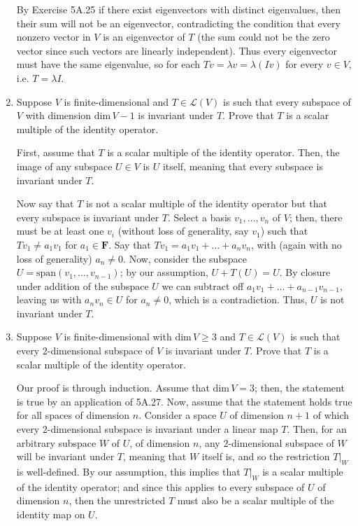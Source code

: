 \documentclass{book}
\begin{document}
\begin{enumerate}
By Exercise 5A.25 if there exist eigenvectors with distinct eigenvalues, then their sum will not be an eigenvector, contradicting the condition that every nonzero vector in \(V\) is an eigenvector of \(T\) (the sum could not be the zero vector since such vectors are linearly independent).  Thus every eigenvector must have the same eigenvalue, so for each \(Tv=\lambda{v}=\lambda(Iv)\) for every \(v \in V\), i.e. \(T=\lambda{I}\).

\item Suppose \(V\) is finite-dimensional and \(T \in \mathcal{L}(V)\) is such that every subspace of \(V\) with dimension \(\textrm{dim} \, V - 1\) is invariant under \(T\).  Prove that \(T\) is a scalar multiple of the identity operator.

First, assume that \(T\) is a scalar multiple of the identity operator.  Then, the image of any subspace \(U \in V\) is \(U\) itself, meaning that every subspace is invariant under \(T\).

Now say that \(T\) is not a scalar multiple of the identity operator but that every subspace is invariant under \(T\).  Select a basis \(v_1,\dots,v_n\) of \(V\); then, there must be at least one \(v_i\) (without loss of generality, say \(v_1\)) such that \(Tv_1 \neq a_1v_1\) for \(a_1 \in \textbf{F}\).  Say that \(Tv_1 = a_1v_1 + \dots + a_nv_n\), with (again with no loss of generality) \(a_n \neq 0\).  Now, consider the subspace \(U = \text{span}(v_1,\dots,v_{n-1})\); by our assumption, \(U + T(U) = U\).  By closure under addition of the subspace \(U\) we can subtract off \(a_1v_1 + \dots + a_{n-1}v_{n-1}\), leaving us with \(a_nv_n \in U\) for \(a_n \neq 0\), which is a contradiction.  Thus, \(U\) is not invariant under \(T\).

\item Suppose \(V\) is finite-dimensional with \(\textrm{dim} \, V \geq 3\) and \(T \in \mathcal{L}(V)\) is such that every \(2\)-dimensional subspace of \(V\) is invariant under \(T\).  Prove that \(T\) is a scalar multiple of the identity operator.

Our proof is through induction.  Assume that \(\text{dim} \, V = 3\); then, the statement is true by an application of 5A.27.  Now, assume that the statement holds true for all spaces of dimension \(n\).  Consider a space \(U\) of dimension \(n+1\) of which every \(2\)-dimensional subspace is invariant under a linear map \(T\). 
 Then, for an arbitrary subspace \(W\) of \(U\), of dimension \(n\), any \(2\)-dimensional subspace of \(W\) will be invariant under \(T\), meaning that \(W\) itself is, and so the restriction \(T\vert_W\) is well-defined.  By our assumption, this implies that \(T\vert_W\) is a scalar multiple of the identity operator; and since this applies to every subspace of \(U\) of dimension \(n\), then the unrestricted \(T\) must also be a scalar multiple of the identity map on \(U\).


\end{enumerate}
\end{document}
